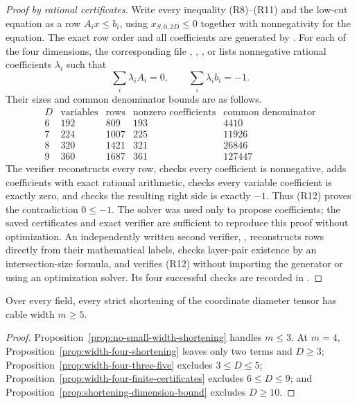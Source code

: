 \begin{proof}[Proof by rational certificates]
Write every inequality (R8)--(R11) and the low-cut equation
as a row $A_i x\le b_i$, using
$x_{S,0,2D}\le0$ together with nonnegativity for the equation.
The exact row order and all coefficients are generated by
.
For each of the four dimensions, the corresponding file
,
,
, or
lists nonnegative rational coefficients $\lambda_i$ such that
\[
 \sum_i\lambda_i A_i=0,\qquad
 \sum_i\lambda_i b_i=-1.                           \tag{R12}
\]
Their sizes and common denominator bounds are as follows.
\[
\begin{array}{c|r|r|r|r}
 D&\text{variables}&\text{rows}&
 \text{nonzero coefficients}&\text{common denominator}\\\hline
 6&192&809&193&4410\\
 7&224&1007&225&11926\\
 8&320&1421&321&26846\\
 9&360&1687&361&127447
\end{array}
\]
The verifier reconstructs every row, checks every coefficient
is nonnegative, adds coefficients with exact rational
arithmetic, checks every variable coefficient is exactly
zero, and checks the resulting right side is exactly $-1$.
Thus (R12) proves the contradiction $0\le-1$.
The solver was used only to propose coefficients; the saved
certificates and exact verifier are sufficient to reproduce
this proof without optimization.
An independently written second verifier,
,
reconstructs rows directly from their mathematical labels,
checks layer-pair existence by an intersection-size formula,
and verifies (R12) without importing the generator or using
an optimization solver.  Its four successful checks are
recorded in .
\end{proof}

\begin{theorem}
\label{thm:no-shortening-width-four}
Over every field, every strict shortening of the coordinate
diameter tensor has cable width $m\ge5$.
\end{theorem}
\begin{proof}
Proposition~\ref{prop:no-small-width-shortening} handles
$m\le3$.  At $m=4$,
Proposition~\ref{prop:width-four-shortening} leaves only
two terms and $D\ge3$; Proposition~\ref{prop:width-four-three-five}
excludes $3\le D\le5$;
Proposition~\ref{prop:width-four-finite-certificates}
excludes $6\le D\le9$; and
Proposition~\ref{prop:shortening-dimension-bound}
excludes $D\ge10$.
\end{proof}

